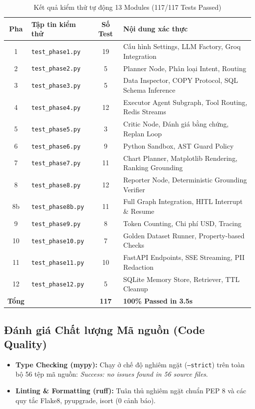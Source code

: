 \documentclass[12pt, a4paper]{article}
\begin{document}
\begin{table}[H]
\centering
\caption{Kết quả kiểm thử tự động 13 Modules (117/117 Tests Passed)}
\label{tab:test_phases}
\begin{tabularx}{\textwidth}{clcX}
\toprule
\textbf{Pha} & \textbf{Tập tin kiểm thử} & \textbf{Số Test} & \textbf{Nội dung xác thực} \\
\midrule
1 & \texttt{test\_phase1.py} & 19 & Cấu hình Settings, LLM Factory, Groq Integration \\
2 & \texttt{test\_phase2.py} & 5 & Planner Node, Phân loại Intent, Routing \\
3 & \texttt{test\_phase3.py} & 5 & Data Inspector, COPY Protocol, SQL Schema Inference \\
4 & \texttt{test\_phase4.py} & 12 & Executor Agent Subgraph, Tool Routing, Redis Streams \\
5 & \texttt{test\_phase5.py} & 3 & Critic Node, Đánh giá bằng chứng, Replan Loop \\
6 & \texttt{test\_phase6.py} & 9 & Python Sandbox, AST Guard Policy \\
7 & \texttt{test\_phase7.py} & 11 & Chart Planner, Matplotlib Rendering, Ranking Grounding \\
8 & \texttt{test\_phase8.py} & 12 & Reporter Node, Deterministic Grounding Verifier \\
8b & \texttt{test\_phase8b.py} & 11 & Full Graph Integration, HITL Interrupt \& Resume \\
9 & \texttt{test\_phase9.py} & 8 & Token Counting, Chi phí USD, Tracing \\
10 & \texttt{test\_phase10.py} & 7 & Golden Dataset Runner, Property-based Checks \\
11 & \texttt{test\_phase11.py} & 10 & FastAPI Endpoints, SSE Streaming, PII Redaction \\
12 & \texttt{test\_phase12.py} & 5 & SQLite Memory Store, Retriever, TTL Cleanup \\
\midrule
\textbf{Tổng} & & \textbf{117} & \textbf{100\% Passed in 3.5s} \\
\bottomrule
\end{tabularx}
\end{table}

\subsection{Đánh giá Chất lượng Mã nguồn (Code Quality)}
\begin{itemize}
    \item \textbf{Type Checking (mypy):} Chạy ở chế độ nghiêm ngặt (\texttt{--strict}) trên toàn bộ 56 tệp mã nguồn: \textit{Success: no issues found in 56 source files}.
    \item \textbf{Linting \& Formatting (ruff):} Tuân thủ nghiêm ngặt chuẩn PEP 8 và các quy tắc Flake8, pyupgrade, isort (0 cảnh báo).
\end{itemize}
\end{document}
